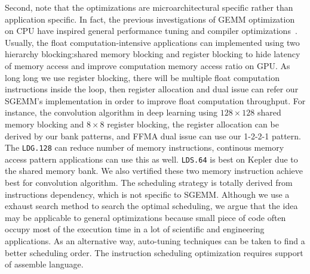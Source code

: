 Second, note that the optimizations are microarchitectural specific rather than application specific. In fact, the previous investigations of GEMM optimization on CPU have inspired general performance tuning and compiler optimizations~\cite{lam1991cache}.  
Usually, the float computation-intensive applications can implemented using two hierarchy blocking:shared memory blocking and register blocking to hide latency of memory access and improve computation memory access ratio on GPU. As long long we use register blocking, there will be multiple float computation instructions inside the loop, then register allocation  and dual issue can refer our SGEMM's implementation in order to improve float computation throughput. For instance, the convolution algorithm in deep learning using $128\times128$ shared memory blocking and $8\times8$ register blocking, the register allocation can be derived by our bank patterns, and FFMA dual issue can use our 1-2-2-1 pattern. The {\tt LDG.128} can reduce number of memory instructions, continous memory access pattern applications can use this as well.
{\tt LDS.64} is best on Kepler due to the shared memory bank. We also vertified these two memory instruction achieve best for convolution algorithm.
The scheduling strategy is totally derived from instructions dependency,
which is not specific to SGEMM. Although we use a exhaust search method to search the optimal scheduling, we
argue that the idea may be applicable to general optimizations
because small piece of code often occupy most of the
execution time in a lot of scientific and engineering applications.
As an alternative way, auto-tuning techniques%
can be taken to find a better scheduling order. The instruction
scheduling optimization requires support of assemble language.



